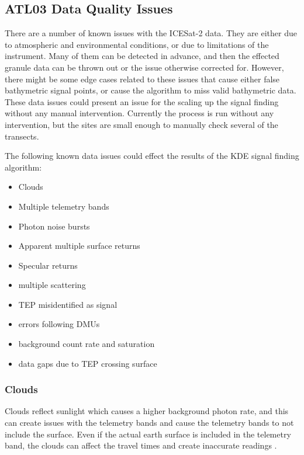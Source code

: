 \subsection{ATL03 Data Quality Issues}\label{sec:discussion-photon-issues}

There are a number of known issues with the ICESat-2 data. They are either due to atmospheric and environmental conditions, or due to limitations of the instrument. Many of them can be detected in advance, and then the effected granule data can be thrown out or the issue otherwise corrected for. However, there might be some edge cases related to these issues that cause either false bathymetric signal points, or cause the algorithm to miss valid bathymetric data. These data issues could present an issue for the scaling up the signal finding without any manual intervention. Currently the process is run without any intervention, but the sites are small enough to manually check several of the transects.

The following known data issues could effect the results of the KDE signal finding algorithm:

\begin{itemize}
    \item Clouds
    \item Multiple telemetry bands
    \item Photon noise bursts %
    \item Apparent multiple surface returns %
    \item Specular returns
    \item multiple scattering %
    \item TEP misidentified as signal %
    \item errors following DMUs %
    \item background count rate and saturation
    \item data gaps due to TEP crossing surface %
\end{itemize}

\subsubsection{Clouds}

Clouds reflect sunlight which causes a higher background photon rate, and this can create issues with the telemetry bands and cause the telemetry bands to not include the surface. Even if the actual earth surface is included in the telemetry band, the clouds can affect the travel times and create inaccurate readings \parencite{atl03knownissues}.

